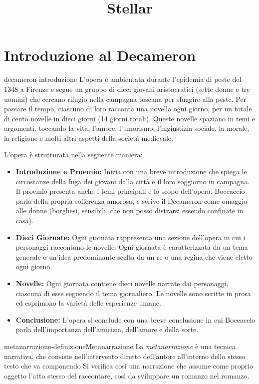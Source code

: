 \documentclass[preview]{standalone}
\begin{document}
\title{Stellar}
\genpage

\section{Introduzione al Decameron}

\begin{snippet}{decameron-introduzione}
    L'opera è ambientata durante l'epidemia di peste del 1348 a Firenze
    e segue un gruppo di dieci giovani aristocratici (sette donne e tre uomini)
    che cercano rifugio nella campagna toscana per sfuggire alla peste.
    Per passare il tempo, ciascuno di loro racconta una novella ogni giorno,
    per un totale di cento novelle in dieci giorni (14 giorni totali).
    Queste novelle spaziano in temi e argomenti, toccando la vita, l'amore, l'umorismo,
    l'ingiustizia sociale, la morale, la religione e molti altri aspetti della società medievale.
    
    L'opera è strutturata nella seguente maniera:
    \begin{itemize}
        \item \textbf{Introduzione e Proemio:} Inizia con una breve introduzione che spiega le circostanze della fuga dei giovani dalla città e il loro soggiorno in campagna. Il proemio presenta anche i temi principali e lo scopo dell'opera.
            Boccaccio parla della propria sofferenza amorosa, e scrive il Decameron come omaggio alle donne (borghesi, sensibili, che non posso distrarsi essendo confinate in casa).
        \item \textbf{Dieci Giornate:} Ogni giornata rappresenta una sezione dell'opera in cui i personaggi raccontano le novelle. Ogni giornata è caratterizzata da un tema generale o un'idea predominante scelta da un re o una regina che viene eletto ogni giorno.
        \item \textbf{Novelle:} Ogni giornata contiene dieci novelle narrate dai personaggi, ciascuna di esse seguendo il tema giornaliero. Le novelle sono scritte in prosa ed esprimono la varietà delle esperienze umane.
        \item \textbf{Conclusione:} L'opera si conclude con una breve conclusione in cui Boccaccio parla dell'importanza dell'amicizia, dell'amore e della sorte.
    \end{itemize}
\end{snippet}

\begin{snippetdefinition}{metanarrazione-definizione}{Metanarrazione}
    La \textit{metanarrazione} è una tecnica narrativa,
    che consiste nell'intervento diretto dell'autore all'interno dello stesso testo che va componendo
    Si verifica così una narrazione che assume come proprio oggetto l'atto stesso del raccontare,
    così da sviluppare un romanzo nel romanzo.
\end{snippetdefinition}
\end{document}
